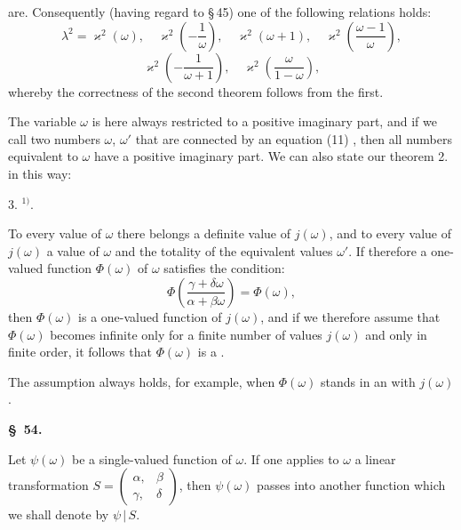 are. Consequently (having regard to \S\,45) one of the following
relations holds:
\[
\lambda^2 = \varkappa^2(\omega), \quad \varkappa^2\!\left(-\frac{1}{\omega}\right), \quad \varkappa^2(\omega+1), \quad \varkappa^2\!\left(\frac{\omega-1}{\omega}\right),
\]
\[
\varkappa^2\!\left(-\frac{1}{\omega+1}\right), \quad \varkappa^2\!\left(\frac{\omega}{1-\omega}\right),
\]
whereby the correctness of the second theorem follows from the first.

The variable $\omega$ is here always restricted to a positive
imaginary part, and if we call two numbers $\omega$, $\omega'$ that are
connected by an equation (11) , then all numbers
equivalent to $\omega$ have a positive imaginary part.
We can also state our theorem 2. in this way:

3. $^{1)}$.

To every value of $\omega$ there belongs a definite value of $j(\omega)$,
and to every value of $j(\omega)$ a value of $\omega$ and the totality
 of the equivalent values $\omega'$. If therefore a one-valued
function $\Phi(\omega)$ of $\omega$ satisfies the condition:
\[
\Phi\!\left(\frac{\gamma+\delta\omega}{\alpha+\beta\omega}\right) = \Phi(\omega),
\]
then $\Phi(\omega)$ is a one-valued function of $j(\omega)$, and if we
therefore assume that $\Phi(\omega)$ becomes infinite only for a finite
number of values $j(\omega)$ and only in finite order, it follows
that $\Phi(\omega)$ is a .

The assumption always holds, for example, when $\Phi(\omega)$
stands in an  with $j(\omega)$.

\begin{center}
\textbf{\S\ 54. }
\end{center}

Let $\psi(\omega)$ be a single-valued function of $\omega$. If one applies
to $\omega$ a linear transformation $S = \begin{pmatrix} \alpha, & \beta \\ \gamma, & \delta \end{pmatrix}$, then $\psi(\omega)$
passes into another function
which we shall denote by $\psi\,|\,S$.

\begingroup
\renewcommand{\thefootnote}{1)}
\endgroup
